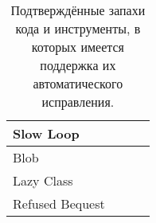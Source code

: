 \begin{table}[]
\begin{tabular}{|l|l|l|l|}
Slow Loop                                                             &            &            &            \\ \hline
Blob                                                                  &            &            &            \\ \hline
Lazy Class                                                            &            &            &            \\ \hline
Refused Bequest                                                       &            &            &            \\ \hline
\end{tabular}
\caption{Подтверждённые запахи кода и инструменты, в которых имеется поддержка их автоматического исправления.}
\end{table}


